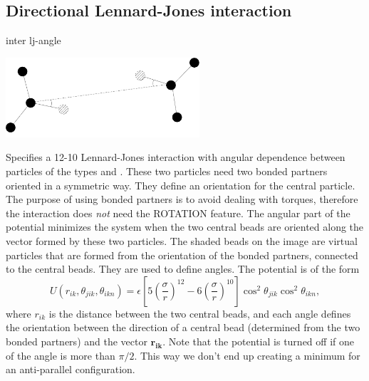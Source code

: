 \subsection{Directional Lennard-Jones interaction}
\begin{essyntax}
  inter   lj-angle
  \var{\epsilon} \var{\sigma}
    
    
  \begin{features}
  \end{features}
\end{essyntax}

\begin{center}
  \includegraphics[height=8em]{figures/hbond}
\end{center}

Specifies a 12-10 Lennard-Jones interaction with angular dependence between
particles of the types  and . These two particles need
two bonded partners oriented in a symmetric way. They define an orientation
for the central particle. The purpose of using bonded partners is to avoid
dealing with torques, therefore the interaction does \emph{not} need the
ROTATION feature. The angular part of the potential minimizes the system when
the two central beads are oriented along the vector formed by these two
particles. The shaded beads on the image are virtual particles that are formed
from the orientation of the bonded partners, connected to the central
beads. They are used to define angles. The potential is of the form
\begin{equation}
  U(r_{ik},\theta_{jik},\theta_{ikn})=\epsilon\left[5\left(\frac{\sigma}r\right)^{12}-6\left(\frac{\sigma}{r}\right)^{10}\right]\cos^2\theta_{jik}\cos^2\theta_{ikn},
\end{equation}
where $r_{ik}$ is the distance between the two central beads, and each angle
defines the orientation between the direction of a central bead (determined
from the two bonded partners) and the vector $\mathbf{r_{ik}}$. Note that the
potential is turned off if one of the angle is more than $\pi/2$. This way we
don't end up creating a minimum for an anti-parallel configuration.

